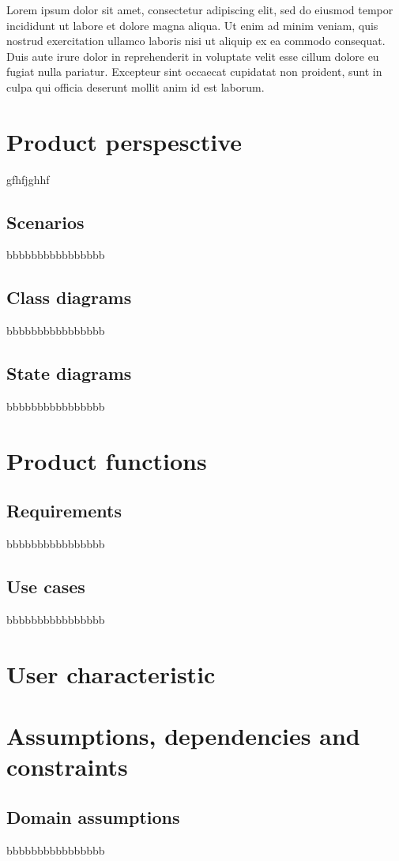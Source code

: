 Lorem ipsum dolor sit amet, consectetur adipiscing elit, sed do eiusmod tempor incididunt ut labore et dolore magna aliqua. Ut enim ad minim veniam, quis nostrud exercitation ullamco laboris nisi ut aliquip ex ea commodo consequat. Duis aute irure dolor in reprehenderit in voluptate velit esse cillum dolore eu fugiat nulla pariatur. Excepteur sint occaecat cupidatat non proident, sunt in culpa qui officia deserunt mollit anim id est laborum.

\newpage

\section{Product perspesctive}
\label{sec:product_perspesctive}%
gfhfjghhf

\subsection{Scenarios}
\label{subsec:scenarios}%
bbbbbbbbbbbbbbbb

\subsection{Class diagrams}
\label{subsec:class_diagrams}%
bbbbbbbbbbbbbbbb

\subsection{State diagrams}
\label{subsec:state_diagrams}%
bbbbbbbbbbbbbbbb

\section{Product functions}
\label{sec:product_functions}%

\subsection{Requirements}
\label{subsec:requirements}%
bbbbbbbbbbbbbbbb

\subsection{Use cases}
\label{subsec:use_cases}%
bbbbbbbbbbbbbbbb

\section{User characteristic}
\label{sec:user_characteristic}%

\section{Assumptions, dependencies and constraints}
\label{sec:assumptions_dependencies_constraints}%

\subsection{Domain assumptions}
\label{subsec:domain_assumptions}%
bbbbbbbbbbbbbbbb

